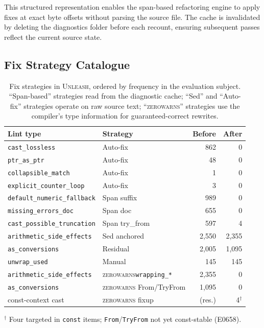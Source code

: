 \documentclass[sigconf,review,anonymous]{acmart}
\newcommand{\tool}{\textsc{Unleash}\xspace}
\newcommand{\zerowarns}{\textsc{zerowarns}\xspace}
\newcommand{\tcode}{\path}
\begin{document}
This structured representation enables the span-based refactoring engine
to apply fixes at exact byte offsets without parsing the source file.
The cache is invalidated by deleting the diagnostics folder before each
recount, ensuring subsequent passes reflect the current source state.

\subsection{Fix Strategy Catalogue}\label{sec:strategies}

\begin{table}[t]
  \caption{Fix strategies in \tool, ordered by frequency in the evaluation
    subject. ``Span-based'' strategies read from the diagnostic cache;
    ``Sed'' and ``Auto-fix'' strategies operate on raw source text;
    ``\zerowarns'' strategies use the compiler's type information for
    guaranteed-correct rewrites.}
  \label{tab:strategies}
  \centering
  \footnotesize
  \begin{tabular}{lp{2.6cm}rr}
    \toprule
    \textbf{Lint type} & \textbf{Strategy} & \textbf{Before} & \textbf{After} \\
    \midrule
    \texttt{cast\_lossless}          & Auto-fix          & 862   & 0    \\
    \texttt{ptr\_as\_ptr}            & Auto-fix          & 48    & 0    \\
    \texttt{collapsible\_match}      & Auto-fix          & 1     & 0    \\
    \texttt{explicit\_counter\_loop} & Auto-fix          & 3     & 0    \\
    \hline
    \texttt{default\_numeric\_fallback} & Span suffix    & 989  & 0   \\
    \texttt{missing\_errors\_doc}    & Span doc          & 655   & 0    \\
    \texttt{cast\_possible\_truncation} & Span try\_from & 597   & 4    \\
    \hline
    \texttt{arithmetic\_side\_effects} & Sed anchored    & 2,550 & 2,355 \\
    \hline
    \texttt{as\_conversions}         & Residual          & 2,005 & 1,095 \\
    \texttt{unwrap\_used}            & Manual            & 145   & 145  \\
    \hline
    \texttt{arithmetic\_side\_effects} & \zerowarns \texttt{wrapping\_*} & 2,355 & 0 \\
    \texttt{as\_conversions}         & \zerowarns From/TryFrom           & 1,095 & 0 \\
    const-context cast               & \zerowarns fixup                  & (res.) & 4$^\dagger$ \\
    \bottomrule
  \end{tabular}
  \vspace{2pt}
  {\footnotesize $^\dagger$ Four targeted \tcode{\#[allow]} in \texttt{const}
    items; \texttt{From}/\texttt{TryFrom} not yet const-stable (E0658).}
\end{table}
\end{document}
